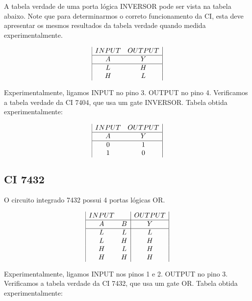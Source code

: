 \documentclass{article}
\begin{document}
A tabela verdade de uma porta lógica INVERSOR pode ser vista na tabela abaixo. Note que para determinarmos o correto funcionamento da CI, esta deve apresentar os mesmos resultados da tabela verdade quando medida experimentalmente.

\begin{displaymath}
\begin{array}{|c c|c|}
INPUT & OUTPUT\\
\hline
A & Y\\
\hline %
L & H\\
H & L\\
\end{array}
\end{displaymath}

Experimentalmente, ligamos INPUT no pino 3. OUTPUT no pino 4. Verificamos a tabela verdade da CI 7404, que usa um gate INVERSOR. Tabela obtida experimentalmente:

\begin{displaymath}
\begin{array}{|c c|c|}
INPUT & OUTPUT\\
\hline
A & Y\\
\hline %
0 & 1\\
1 & 0\\
\end{array}
\end{displaymath}

\subsection{CI 7432}
O circuito integrado 7432 possui 4 portas lógicas OR.


\begin{displaymath}
\begin{array}{|c c|c|}
INPUT & & OUTPUT\\
\hline
A & B & Y\\
\hline %
L & L & L\\
L & H & H\\
H & L & H\\
H & H & H\\
\end{array}
\end{displaymath}

Experimentalmente, ligamos INPUT nos pinos 1 e 2. OUTPUT no pino 3. Verificamos a tabela verdade da CI 7432, que usa um gate OR. Tabela obtida experimentalmente:
\end{document}
